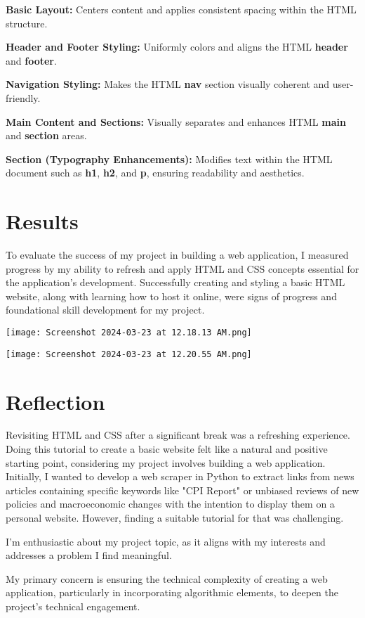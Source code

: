 \documentclass[10pt,twocolumn]{article}
\begin{document}
\textbf{Basic Layout:} Centers content and applies consistent spacing within the HTML structure.

\textbf{Header and Footer Styling:} Uniformly colors and aligns the HTML 
\textbf{header} and \textbf{footer}.

\textbf{Navigation Styling:} Makes the HTML \textbf{nav} section visually coherent and user-friendly.

\textbf{Main Content and Sections: }Visually separates and enhances HTML \textbf{main} and \textbf{section }areas.

\textbf{Section (Typography Enhancements):} Modifies text within the HTML document such as \textbf{h1},\textbf{ h2}, and \textbf{p}, ensuring readability and aesthetics. 

\section{Results}

To evaluate the success of my project in building a web application, I measured progress by my ability to refresh and apply HTML and CSS concepts essential for the application's development. Successfully creating and styling a basic HTML website, along with learning how to host it online, were signs of progress and foundational skill development for my project.

\texttt{[image: Screenshot 2024-03-23 at 12.18.13 AM.png]}

\hspace{10cm}

\texttt{[image: Screenshot 2024-03-23 at 12.20.55 AM.png]}

\section{Reflection}

Revisiting HTML and CSS after a significant break was a refreshing experience. Doing this tutorial to create a basic website felt like a natural and positive starting point, considering my project involves building a web application. Initially, I wanted to develop a web scraper in Python to extract links from news articles containing specific keywords like "CPI Report" or unbiased reviews of new policies and macroeconomic changes with the intention to display them on a personal website. However, finding a suitable tutorial for that was challenging. 

I'm enthusiastic about my project topic, as it aligns with my interests and addresses a problem I find meaningful. 

My primary concern is ensuring the technical complexity of creating a web application, particularly in incorporating algorithmic elements, to deepen the project's technical engagement.
\end{document}
